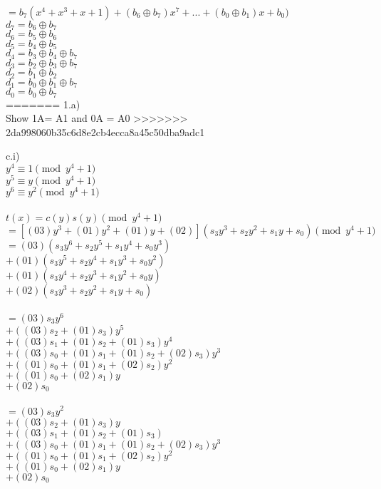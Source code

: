 \documentclass{assignment}
\begin{document}
\begin{problemlist}
\begin{problem}
\begin{answer}
$=b_7(x^4+x^3+x+1)+(b_6\oplus b_7)x^7+...+(b_0\oplus b_1)x+b_0)$\\
$d_7=b_6\oplus b_7$\\
$d_6=b_5\oplus b_6$\\
$d_5=b_4\oplus b_5$\\
$d_4=b_3\oplus b_4 \oplus b_7$\\
$d_3=b_2\oplus b_3 \oplus b_7$\\
$d_2=b_1\oplus b_2$\\
$d_1=b_0\oplus b_1 \oplus b_7$\\
$d_0=b_0 \oplus b_7$\\
=======
1.a)\\
Show 1A= A1
and 0A = A0
>>>>>>> 2da998060b35c6d8e2cb4ecca8a45c50dba9adc1

c.i)\\
$y^4\equiv 1 \pmod {y^4+1}$\\
$y^5\equiv y \pmod {y^4+1}$\\
$y^6\equiv y^2 \pmod {y^4+1}$\\
\\
$t(x)=c(y)s(y) \pmod {y^4+1}$\\
$=[(03)y^3+(01)y^2+(01)y+(02)](s_3y^3+s_2y^2+s_1y+s_0) \pmod {y^4+1}$\\
$=(03)(s_3y^6+s_2y^5+s_1y^4+s_0y^3)$\\
$+(01)(s_3y^5+s_2y^4+s_1y^3+s_0y^2)$\\
$+(01)(s_3y^4+s_2y^3+s_1y^2+s_0y)$\\
$+(02)(s_3y^3+s_2y^2+s_1y+s_0)$\\
\\
$=(03)s_3y^6$\\
$+((03)s_2+(01)s_3)y^5$\\
$+((03)s_1+(01)s_2+(01)s_3)y^4$\\
$+((03)s_0+(01)s_1+(01)s_2+(02)s_3)y^3$\\
$+((01)s_0+(01)s_1+(02)s_2)y^2$\\
$+((01)s_0+(02)s_1)y$\\
$+(02)s_0$\\
\\
$=(03)s_3y^2$\\
$+((03)s_2+(01)s_3)y$\\
$+((03)s_1+(01)s_2+(01)s_3)$\\
$+((03)s_0+(01)s_1+(01)s_2+(02)s_3)y^3$\\
$+((01)s_0+(01)s_1+(02)s_2)y^2$\\
$+((01)s_0+(02)s_1)y$\\
$+(02)s_0$\\

\end{answer}
\end{problem}
\end{problemlist}
\end{document}
